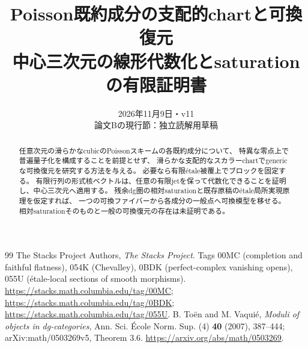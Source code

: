 \documentclass[a4paper,11pt]{ltjsarticle}
\title{Poisson既約成分の支配的chartと可換復元\\\large 中心三次元の線形代数化とsaturationの有限証明書}
\author{}\date{2026年11月9日・v11\\\small 論文Bの現行節：独立読解用草稿}
\theoremstyle{definition}\newtheorem{definition}[theorem]{定義}\newtheorem{example}[theorem]{例}
\theoremstyle{remark}\newtheorem{remark}[theorem]{注意}
\begin{document}
\maketitle
\begin{abstract}
任意次元の滑らかなcubicのPoissonスキームの各既約成分について、
特異な零点上で普遍量子化を構成することを前提とせず、
滑らかな支配的なスカラーchartでgenericな可換復元を研究する方法を与える。
必要なら有限étale被覆上でブロックを固定する。
有限行列の形式核ベクトルは、任意の有限jetを保って代数化できることを証明し、中心三次元へ適用する。
残余dg圏の相対saturationと既存原稿のétale局所実現原理を仮定すれば、
一つの可換ファイバーから各成分の一般点へ可換模型を移せる。
相対saturationそのものと一般の可換復元の存在は未証明である。
\end{abstract}
\tableofcontents

\begin{thebibliography}{99}
 The Stacks Project Authors, \emph{The Stacks Project}.
Tags 00MC (completion and faithful flatness), 054K (Chevalley),
0BDK (perfect-complex vanishing opens), 055U (étale-local sections of smooth morphisms).
\url{https://stacks.math.columbia.edu/tag/00MC};
\url{https://stacks.math.columbia.edu/tag/0BDK};
\url{https://stacks.math.columbia.edu/tag/055U}.
 B. Toën and M. Vaquié,
\emph{Moduli of objects in dg-categories},
Ann. Sci. École Norm. Sup. (4) \textbf{40} (2007), 387--444;
arXiv:math/0503269v5, Theorem 3.6.
\url{https://arxiv.org/abs/math/0503269}.
\end{thebibliography}
\end{document}
